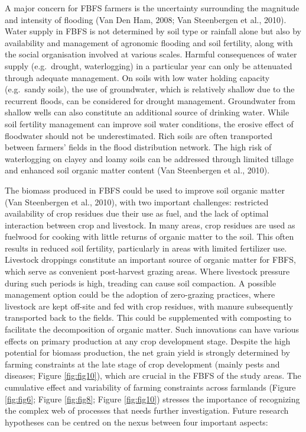 \documentclass[]{elsarticle} %
\begin{document}
A major concern for FBFS farmers is the uncertainty surrounding the magnitude and intensity of flooding (Van Den Ham, 2008; Van Steenbergen et al., 2010). Water supply in FBFS is not determined by soil type or rainfall alone but also by availability and management of agronomic flooding and soil fertility, along with the social organisation involved at various scales. Harmful consequences of water supply (e.g.~drought, waterlogging) in a particular year can only be attenuated through adequate management. On soils with low water holding capacity (e.g.~sandy soils), the use of groundwater, which is relatively shallow due to the recurrent floods, can be considered for drought management. Groundwater from shallow wells can also constitute an additional source of drinking water. While soil fertility management can improve soil water conditions, the erosive effect of floodwater should not be underestimated. Rich soils are often transported between farmers' fields in the flood distribution network. The high risk of waterlogging on clayey and loamy soils can be addressed through limited tillage and enhanced soil organic matter content (Van Steenbergen et al., 2010).

The biomass produced in FBFS could be used to improve soil organic matter (Van Steenbergen et al., 2010), with two important challenges: restricted availability of crop residues due their use as fuel, and the lack of optimal interaction between crop and livestock. In many areas, crop residues are used as fuelwood for cooking with little returns of organic matter to the soil. This often results in reduced soil fertility, particularly in areas with limited fertilizer use. Livestock droppings constitute an important source of organic matter for FBFS, which serve as convenient post-harvest grazing areas. Where livestock pressure during such periods is high, treading can cause soil compaction. A possible management option could be the adoption of zero-grazing practices, where livestock are kept off-site and fed with crop residues, with manure subsequently transported back to the fields. This could be supplemented with composting to facilitate the decomposition of organic matter. Such innovations can have various effects on primary production at any crop development stage. Despite the high potential for biomass production, the net grain yield is strongly determined by farming constraints at the late stage of crop development (mainly pests and diseases; Figure \ref{fig:fig10}), which are crucial in the FBFS of the study areas. The cumulative effect and variability of farming constraints across farmlands (Figure \ref{fig:fig6}; Figure \ref{fig:fig8}; Figure \ref{fig:fig10}) stresses the importance of recognizing the complex web of processes that needs further investigation. Future research hypotheses can be centred on the nexus between four important aspects:
\end{document}
